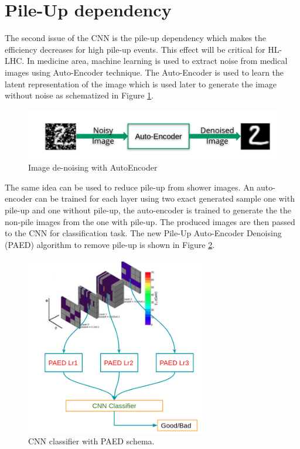 \section{Pile-Up dependency}
The second issue of the CNN is the pile-up dependency which makes the efficiency decreases for high pile-up events. This effect will be critical for HL-LHC. In medicine area, machine learning is used to extract noise from medical images using Auto-Encoder technique. The Auto-Encoder is used to learn the latent representation of the image which is used later to generate the image without noise as schematized in Figure \ref{fig:Adx3:AutoEncoder}.

\begin{figure}[H]
    \centering
    \includegraphics[width=1\textwidth]{Adx/Adx3/Img/AutoEncoder.png}
    \caption{Image de-noising with AutoEncoder}
    \label{fig:Adx3:AutoEncoder}
\end{figure}

The same idea can be used to reduce pile-up from shower images. An auto-encoder can be trained for each layer using two exact generated sample one with pile-up and one without pile-up, the auto-encoder is trained to generate the the non-pile images from the one with pile-up. The produced images are then passed to the CNN for classification task. The new Pile-Up Auto-Encoder Denoising (PAED) algorithm to remove pile-up is shown in Figure \ref{fig:Adx3:PAED}.

\begin{figure}[ht]
    \centering
    \includegraphics[width=0.7\textwidth]{Adx/Adx3/Img/PAED.png}
    \caption{CNN classifier with PAED schema.}
    \label{fig:Adx3:PAED}
\end{figure}